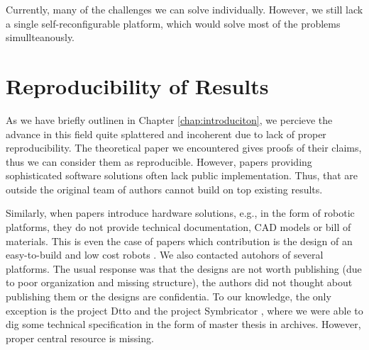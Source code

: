 Currently, many of the challenges we can solve individually. However, we still
lack a single  self-reconfigurable platform, which would
solve most of the problems simullteanously.

\section{Reproducibility of Results}\label{sec:reproducibility}

As we have briefly outlinen in Chapter \ref{chap:introduciton}, we percieve the
advance in this field quite splattered and incoherent due to lack of proper
reproducibility. The theoretical paper we encountered gives proofs of their
claims, thus we can consider them as reproducible. However, papers providing
sophisticated software solutions often lack public implementation. Thus, that
are outside the original team of authors cannot build on top existing results.

Similarly, when papers introduce hardware solutions, e.g., in the form of
robotic platforms, they do not provide technical documentation, CAD models or
bill of materials. This is even the case of papers which contribution is the
design of an easy-to-build and low cost robots \cite{DBLP:conf/robio/YuLW17}. We
also contacted autohors of several platforms. The usual response was that the
designs are not worth publishing (due to poor organization and missing
structure), the authors did not thought about publishing them or the designs are
confidentia. To our knowledge, the only exception is the project Dtto
\cite{otrebla333} and the project Symbricator
\cite{DBLP:journals/corr/abs-1109-2288}, where we were able to dig some
technical specification in the form of master thesis in archives. However,
proper central resource is missing.